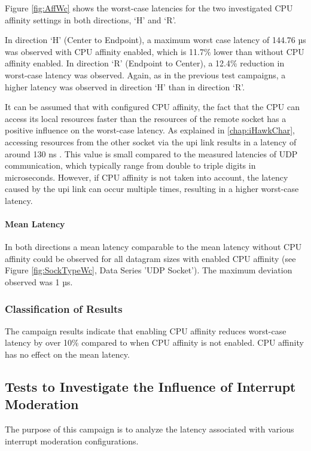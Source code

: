 Figure \ref{fig:AffWc} shows the worst-case latencies for the two investigated \ac{CPU} affinity settings in both directions, `H' and `R'.

In direction `H' (Center to Endpoint), a maximum worst case latency of 144.76 µs was observed with \ac{CPU} affinity enabled, which is 11.7\% lower than without \ac{CPU} affinity enabled. In direction `R' (Endpoint to Center), a 12.4\% reduction in worst-case latency was observed. Again, as in the previous test campaigns, a higher latency was observed in direction `H' than in direction `R'.

It can be assumed that with configured \ac{CPU} affinity, the fact that the \ac{CPU} can access its local resources faster than the resources of the remote socket has a positive influence on the worst-case latency. As explained in \ref{chap:iHawkChar}, accessing resources from the other socket via the \ac{upi} link results in a latency of around 130 ns \cite{setup07}. This value is small compared to the measured latencies of UDP communication, which typically range from double to triple digits in microseconds. However, if \ac{CPU} affinity is not taken into account, the latency caused by the \ac{upi} link can occur multiple times, resulting in a higher worst-case latency.

\paragraph{Mean Latency}

In both directions a mean latency comparable to the mean latency without \ac{CPU} affinity could be observed for all datagram sizes with enabled \ac{CPU} affinity (see Figure \ref{fig:SockTypeWc}, Data Series 'UDP Socket'). The maximum deviation observed was 1 µs.

\subsubsection{Classification of Results}
The campaign results indicate that enabling \ac{CPU} affinity reduces worst-case latency by over 10\% compared to when \ac{CPU} affinity is not enabled. \ac{CPU} affinity has no effect on the mean latency.

\subsection{Tests to Investigate the Influence of Interrupt Moderation}
The purpose of this campaign is to analyze the latency associated with various interrupt moderation configurations.


